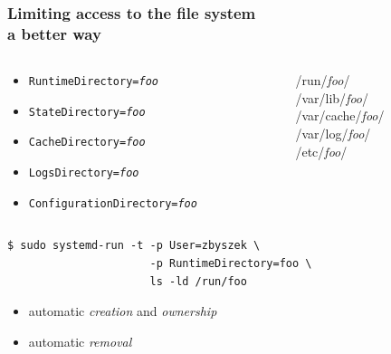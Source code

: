 \documentclass[serif]{beamer}
\begin{document}
\begin{frame}
  \frametitle{Limiting access to the file system\\a better way}
  \pause
  \begin{columns}
    \begin{column}{0.6\textwidth}
      \begin{itemize}
      \item \texttt{RuntimeDirectory=\textit{foo}}
      \item \texttt{StateDirectory=\textit{foo}}
      \item \texttt{CacheDirectory=\textit{foo}}
      \item \texttt{LogsDirectory=\textit{foo}}
      \item \texttt{ConfigurationDirectory=\textit{foo}}
      \end{itemize}
    \end{column}
    \color{gray}
    \begin{column}{0.4\textwidth}
      /run/\textit{foo}/ \\[.32em]
      /var/lib/\textit{foo}/ \\[.32em]
      /var/cache/\textit{foo}/ \\[.32em]
      /var/log/\textit{foo}/ \\[.32em]
      /etc/\textit{foo}/
    \end{column}
  \end{columns}
\end{frame}

\begin{frame}[fragile]
  \begin{verbatim}
$ sudo systemd-run -t -p User=zbyszek \
                      -p RuntimeDirectory=foo \
                      ls -ld /run/foo
  \end{verbatim}

  \begin{itemize}
  \item automatic \textit{creation} and \textit{ownership}
  \item automatic \textit{removal}
  \end{itemize}
\end{frame}
\end{document}
